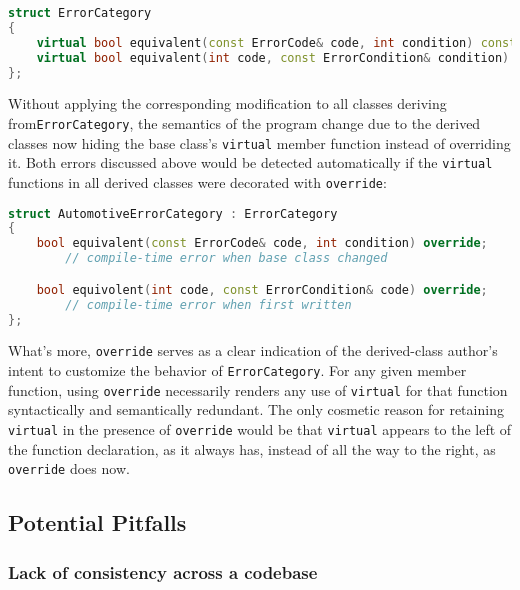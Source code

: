 \begin{lstlisting}[language=C++]
struct ErrorCategory
{
    virtual bool equivalent(const ErrorCode& code, int condition) const;
    virtual bool equivalent(int code, const ErrorCondition& condition) const;
};
\end{lstlisting}

Without applying the corresponding modification to all classes deriving
from\linebreak[4] \lstinline!ErrorCategory!, the semantics of the program change due to
the derived classes now hiding
the base class's
\lstinline!virtual! member function instead of overriding it. Both errors discussed above
would be detected automatically if the \lstinline!virtual!
functions in all derived classes were decorated with \lstinline!override!:

\begin{lstlisting}[language=C++]
struct AutomotiveErrorCategory : ErrorCategory
{
    bool equivalent(const ErrorCode& code, int condition) override;
        // compile-time error when base class changed

    bool equivolent(int code, const ErrorCondition& code) override;
        // compile-time error when first written
};
\end{lstlisting}

\noindent What's more, \lstinline!override! serves as a clear indication of the derived-class author's intent to customize the
behavior of \lstinline!ErrorCategory!. For any given member function, using \lstinline!override! necessarily renders any use of \lstinline!virtual! for
that function syntactically and semantically redundant. The only
cosmetic reason for retaining \lstinline!virtual! in the presence of
\lstinline!override! would be that \lstinline!virtual! appears to the left of
the function declaration, as it always has, instead of all the way to
the right, as \lstinline!override! does now.

\subsection[Potential Pitfalls]{Potential Pitfalls}\label{potential-pitfalls}

\subsubsection[Lack of consistency across a codebase]{Lack of consistency across a codebase}\label{lack-of-consistency-across-a-codebase}

